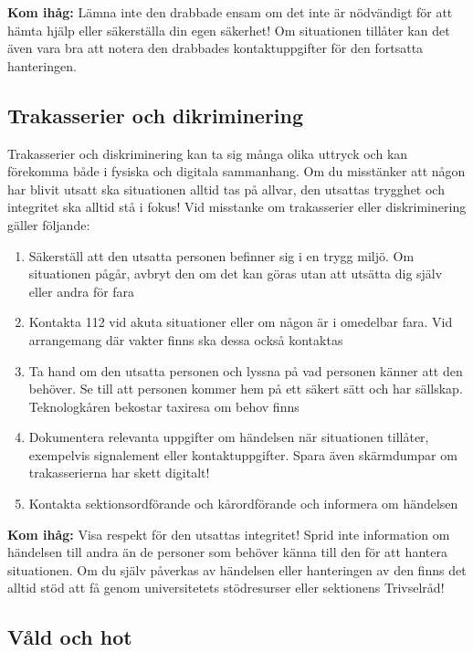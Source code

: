 \documentclass[pdfbookmarks,a4paper,11pt]{article}
\begin{document}
\textbf{Kom ihåg:} Lämna inte den drabbade ensam om det inte är nödvändigt för att hämta hjälp eller säkerställa din egen säkerhet! Om situationen tillåter kan det även vara bra att notera den drabbades kontaktuppgifter för den fortsatta hanteringen.

\subsection{Trakasserier och dikriminering}

Trakasserier och diskriminering kan ta sig många olika uttryck och kan förekomma både i fysiska och digitala sammanhang. Om du misstänker att någon har blivit utsatt ska situationen alltid tas på allvar, den utsattas trygghet och integritet ska alltid stå i fokus! Vid misstanke om trakasserier eller diskriminering gäller följande:

\begin{enumerate}
    \item Säkerställ att den utsatta personen befinner sig i en trygg miljö. Om situationen pågår, avbryt den om det kan göras utan att utsätta dig själv eller andra för fara
    \item Kontakta 112 vid akuta situationer eller om någon är i omedelbar fara. Vid arrangemang där vakter finns ska dessa också kontaktas
    \item Ta hand om den utsatta personen och lyssna på vad personen känner att den behöver. Se till att personen kommer hem på ett säkert sätt och har sällskap. Teknologkåren bekostar taxiresa om behov finns
    \item Dokumentera relevanta uppgifter om händelsen när situationen tillåter, exempelvis signalement eller kontaktuppgifter. Spara även skärmdumpar om trakasserierna har skett digitalt!
    \item Kontakta sektionsordförande och kårordförande och informera om händelsen
\end{enumerate}

\textbf{Kom ihåg:} Visa respekt för den utsattas integritet! Sprid inte information om händelsen till andra än de personer som behöver känna till den för att hantera situationen. Om du själv påverkas av händelsen eller hanteringen av den finns det alltid stöd att få genom universitetets stödresurser eller sektionens Trivselråd!

\subsection{Våld och hot}
\end{document}
